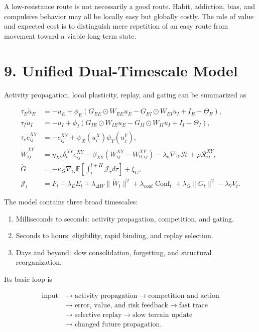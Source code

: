 \documentclass[11pt, a4paper]{article}
\begin{document}
A low-resistance route is not necessarily a good route. Habit, addiction, bias, and compulsive behavior may all be locally easy but globally costly. The role of value and expected cost is to distinguish mere repetition of an easy route from movement toward a viable long-term state.


\section{9. Unified Dual-Timescale Model}

Activity propagation, local plasticity, replay, and gating can be summarized as

\[
\begin{aligned}
\tau_E\dot u_E
&=-u_E+\phi_E\left(G_{EE}\odot W_{EE}u_E-G_{EI}\odot W_{EI}u_I+I_E-\Theta_E\right),\\
\tau_I\dot u_I
&=-u_I+\phi_I\left(G_{IE}\odot W_{IE}u_E-G_{II}\odot W_{II}u_I+I_I-\Theta_I\right),\\
\tau_e\dot e_{ij}^{XY}
&=-e_{ij}^{XY}+\psi_X(u_i^X)\psi_Y(u_j^Y),\\
\dot W_{ij}^{XY}
&=\eta_{XY}\delta_t^{XY}e_{ij}^{XY}
-\beta_{XY}(W_{ij}^{XY}-W_{0,ij}^{XY})
-\lambda_h\nabla_W\mathcal{H}
+\rho\mathcal{R}_{ij}^{XY},\\
\dot G
&=-\kappa_G\nabla_G\mathbb{E}\left[\int_t^{t+H}\mathcal{J}_\tau d\tau\right]+\xi_G,\\
\mathcal{J}_t
&=F_t+\lambda_EE_t+\lambda_{\Delta W}\|\dot W_t\|^2
+\lambda_{\mathrm{conf}}\operatorname{Conf}_t+\lambda_G\|G_t\|^2-\lambda_VV_t.
\end{aligned}
\]

The model contains three broad timescales:

\begin{enumerate}
\item Milliseconds to seconds: activity propagation, competition, and gating.
\item Seconds to hours: eligibility, rapid binding, and replay selection.
\item Days and beyond: slow consolidation, forgetting, and structural reorganization.

\end{enumerate}
Its basic loop is

\[
\begin{aligned}
\text{input}
&\rightarrow\text{activity propagation}
\rightarrow\text{competition and action}\\
&\rightarrow\text{error, value, and risk feedback}
\rightarrow\text{fast trace}\\
&\rightarrow\text{selective replay}
\rightarrow\text{slow terrain update}\\
&\rightarrow\text{changed future propagation}.
\end{aligned}
\]
\end{document}
